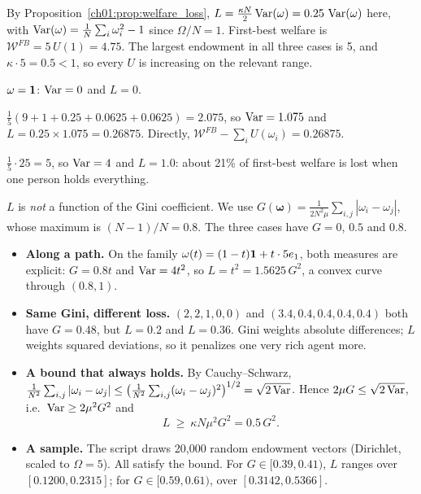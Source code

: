 \documentclass[../solutions_manual.tex]{subfiles}
\begin{document}
By Proposition~\ref{ch01:prop:welfare_loss}, $L = \frac{\kappa N}{2}\operatorname{Var}(\omega) = 0.25\,\operatorname{Var}(\omega)$ here, with $\operatorname{Var}(\omega) = \frac1N\sum_i\omega_i^2 - 1$ since $\Omega/N = 1$. First-best welfare is $\mathcal{W}^{FB} = 5\,U(1) = 4.75$. The largest endowment in all three cases is 5, and $\kappa\cdot 5 = 0.5 < 1$, so every $U$ is increasing on the relevant range.

 $\omega = \mathbf{1}$: $\operatorname{Var} = 0$ and $L = 0$.

 $\frac15(9 + 1 + 0.25 + 0.0625 + 0.0625) = 2.075$, so $\operatorname{Var} = 1.075$ and $L = 0.25 \times 1.075 = 0.26875$. Directly, $\mathcal{W}^{FB} - \sum_i U(\omega_i) = 0.26875$.

 $\frac15 \cdot 25 = 5$, so $\operatorname{Var} = 4$ and $L = 1.0$: about 21\% of first-best welfare is lost when one person holds everything.

 $L$ is \emph{not} a function of the Gini coefficient. We use $G(\boldsymbol\omega) = \frac{1}{2N^2\mu}\sum_{i,j}|\omega_i - \omega_j|$, whose maximum is $(N-1)/N = 0.8$. The three cases have $G = 0$, $0.5$ and $0.8$.
\begin{itemize}
\item \textbf{Along a path.} On the family $\omega(t) = (1-t)\mathbf{1} + t\cdot 5e_1$, both measures are explicit: $G = 0.8t$ and $\operatorname{Var} = 4t^2$, so $L = t^2 = 1.5625\,G^2$, a convex curve through $(0.8, 1)$.
\item \textbf{Same Gini, different loss.} $(2, 2, 1, 0, 0)$ and $(3.4, 0.4, 0.4, 0.4, 0.4)$ both have $G = 0.48$, but $L = 0.2$ and $L = 0.36$. Gini weights absolute differences; $L$ weights squared deviations, so it penalizes one very rich agent more.
\item \textbf{A bound that always holds.} By Cauchy--Schwarz, $\frac{1}{N^2}\sum_{i,j}|\omega_i - \omega_j| \le \bigl(\frac{1}{N^2}\sum_{i,j}(\omega_i-\omega_j)^2\bigr)^{1/2} = \sqrt{2\operatorname{Var}}$. Hence $2\mu G \le \sqrt{2\operatorname{Var}}$, i.e.\ $\operatorname{Var} \ge 2\mu^2G^2$ and
\[
L \ \ge\ \kappa N\mu^2 G^2 = 0.5\,G^2 .
\]
\item \textbf{A sample.} The script draws 20{,}000 random endowment vectors (Dirichlet, scaled to $\Omega = 5$). All satisfy the bound. For $G \in [0.39, 0.41)$, $L$ ranges over $[0.1200, 0.2315]$; for $G \in [0.59, 0.61)$, over $[0.3142, 0.5366]$.
\end{itemize}
\end{document}

